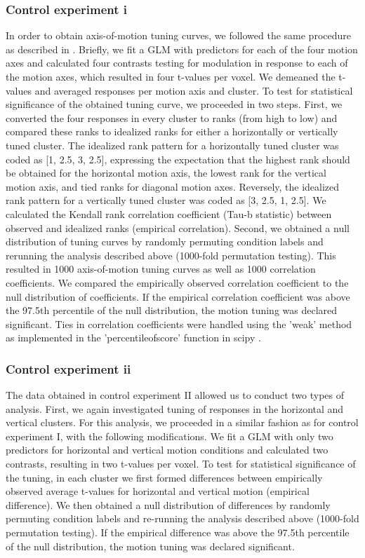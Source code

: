 \subsubsection{Control experiment i}
In order to obtain axis-of-motion tuning curves, we followed the same procedure as described in \cite{EmmerlingPhDThesis}. Briefly, we fit a GLM with predictors for each of the four motion axes and calculated four contrasts testing for modulation in response to each of the motion axes, which resulted in four t-values per voxel. We demeaned the t-values and averaged responses per motion axis and cluster. To test for statistical significance of the obtained tuning curve, we proceeded in two steps. First, we converted the four responses in every cluster to ranks (from high to low) and compared these ranks to idealized ranks for either a horizontally or vertically tuned cluster. The idealized rank pattern for a horizontally tuned cluster was coded as [1, 2.5, 3, 2.5], expressing the expectation that the highest rank should be obtained for the horizontal motion axis, the lowest rank for the vertical motion axis, and tied ranks for diagonal motion axes. Reversely, the idealized rank pattern for a vertically tuned cluster was coded as [3, 2.5, 1, 2.5]. We calculated the Kendall rank correlation coefficient (Tau-b statistic) between observed and idealized ranks (empirical correlation). Second, we obtained a null distribution of tuning curves by randomly permuting condition labels and rerunning the analysis described above (1000-fold permutation testing). This resulted in 1000 axis-of-motion tuning curves as well as 1000 correlation coefficients. We compared the empirically observed correlation coefficient to the null distribution of coefficients. If the empirical correlation coefficient was above the 97.5th percentile of the null distribution, the motion tuning was declared significant. Ties in correlation coefficients were handled using the 'weak' method as implemented in the 'percentileofscore' function in scipy \parencite{scipy2001}.

\subsubsection{Control experiment ii}
The data obtained in control experiment II allowed us to conduct two types of analysis. First, we again investigated tuning of responses in the horizontal and vertical clusters. For this analysis, we proceeded in a similar fashion as for control experiment I, with the following modifications. We fit a GLM with only two predictors for horizontal and vertical motion conditions and calculated two contrasts, resulting in two t-values per voxel. To test for statistical significance of the tuning, in each cluster we first formed differences between empirically observed average t-values for horizontal and vertical motion (empirical difference). We then obtained a null distribution of differences by randomly permuting condition labels and re-running the analysis described above (1000-fold permutation testing). If the empirical difference was above the 97.5th percentile of the null distribution, the motion tuning was declared significant.

